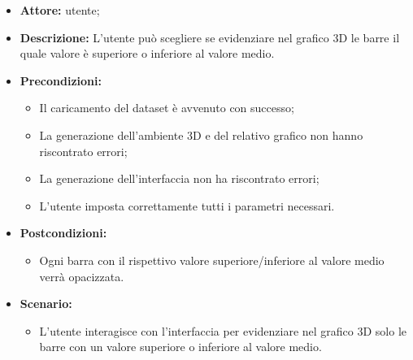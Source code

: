 \begin{itemize}    
    \item \textbf{Attore:} utente;
    \item \textbf{Descrizione:} L'utente può scegliere se evidenziare nel grafico 3D le barre il quale valore è superiore o inferiore al valore medio.
    \item \textbf{Precondizioni:}    
        \begin{itemize}
            \item Il caricamento del dataset è avvenuto con successo;
            \item La generazione dell'ambiente 3D e del relativo grafico non hanno riscontrato errori;
            \item La generazione dell'interfaccia non ha riscontrato errori;
            \item L'utente imposta correttamente tutti i parametri necessari.
        \end{itemize}    
    \item \textbf{Postcondizioni:}
        \begin{itemize}
            \item Ogni barra con il rispettivo valore superiore/inferiore al valore medio verrà opacizzata.
        \end{itemize}    
    \item \textbf{Scenario:} 
        \begin{itemize}
            \item L'utente interagisce con l'interfaccia per evidenziare nel grafico 3D solo le barre con un valore superiore o inferiore al valore medio.
        \end{itemize}
\end{itemize}




